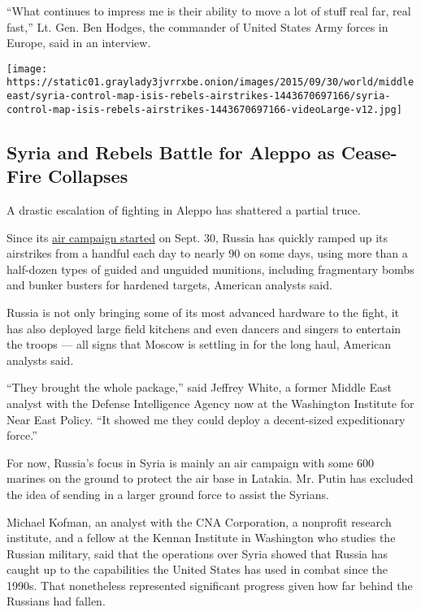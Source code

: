 ``What continues to impress me is their ability to move a lot of stuff
real far, real fast,'' Lt. Gen. Ben Hodges, the commander of United
States Army forces in Europe, said in an interview.

\href{https://www.nytimes3xbfgragh.onion/interactive/2015/09/30/world/middleeast/syria-control-map-isis-rebels-airstrikes.html}{}

\texttt{[image: https://static01.graylady3jvrrxbe.onion/images/2015/09/30/world/middleeast/syria-control-map-isis-rebels-airstrikes-1443670697166/syria-control-map-isis-rebels-airstrikes-1443670697166-videoLarge-v12.jpg]}

\hypertarget{syria-and-rebels-battle-for-aleppo-as-cease-fire-collapses}{%
\subsection{Syria and Rebels Battle for Aleppo as Cease-Fire
Collapses}\label{syria-and-rebels-battle-for-aleppo-as-cease-fire-collapses}}

A drastic escalation of fighting in Aleppo has shattered a partial
truce.

Since its
\href{http://www.nytimes3xbfgragh.onion/2015/10/01/world/europe/russia-airstrikes-syria.html?_r=0}{air
campaign started} on Sept. 30, Russia has quickly ramped up its
airstrikes from a handful each day to nearly 90 on some days, using more
than a half-dozen types of guided and unguided munitions, including
fragmentary bombs and bunker busters for hardened targets, American
analysts said.

Russia is not only bringing some of its most advanced hardware to the
fight, it has also deployed large field kitchens and even dancers and
singers to entertain the troops --- all signs that Moscow is settling in
for the long haul, American analysts said.

``They brought the whole package,'' said Jeffrey White, a former Middle
East analyst with the Defense Intelligence Agency now at the Washington
Institute for Near East Policy. ``It showed me they could deploy a
decent-sized expeditionary force.''

For now, Russia's focus in Syria is mainly an air campaign with some 600
marines on the ground to protect the air base in Latakia. Mr. Putin has
excluded the idea of sending in a larger ground force to assist the
Syrians.

Michael Kofman, an analyst with the CNA Corporation, a nonprofit
research institute, and a fellow at the Kennan Institute in Washington
who studies the Russian military, said that the operations over Syria
showed that Russia has caught up to the capabilities the United States
has used in combat since the 1990s. That nonetheless represented
significant progress given how far behind the Russians had fallen.

